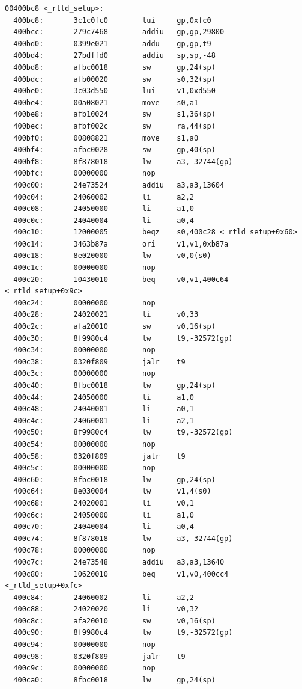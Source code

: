 \documentclass[11pt]{article}
\begin{document}
\begin{verbatim}
00400bc8 <_rtld_setup>:
  400bc8:       3c1c0fc0        lui     gp,0xfc0
  400bcc:       279c7468        addiu   gp,gp,29800
  400bd0:       0399e021        addu    gp,gp,t9
  400bd4:       27bdffd0        addiu   sp,sp,-48
  400bd8:       afbc0018        sw      gp,24(sp)
  400bdc:       afb00020        sw      s0,32(sp)
  400be0:       3c03d550        lui     v1,0xd550
  400be4:       00a08021        move    s0,a1
  400be8:       afb10024        sw      s1,36(sp)
  400bec:       afbf002c        sw      ra,44(sp)
  400bf0:       00808821        move    s1,a0
  400bf4:       afbc0028        sw      gp,40(sp)
  400bf8:       8f878018        lw      a3,-32744(gp)
  400bfc:       00000000        nop
  400c00:       24e73524        addiu   a3,a3,13604
  400c04:       24060002        li      a2,2
  400c08:       24050000        li      a1,0
  400c0c:       24040004        li      a0,4
  400c10:       12000005        beqz    s0,400c28 <_rtld_setup+0x60>
  400c14:       3463b87a        ori     v1,v1,0xb87a
  400c18:       8e020000        lw      v0,0(s0)
  400c1c:       00000000        nop
  400c20:       10430010        beq     v0,v1,400c64 <_rtld_setup+0x9c>
  400c24:       00000000        nop
  400c28:       24020021        li      v0,33
  400c2c:       afa20010        sw      v0,16(sp)
  400c30:       8f9980c4        lw      t9,-32572(gp)
  400c34:       00000000        nop
  400c38:       0320f809        jalr    t9
  400c3c:       00000000        nop
  400c40:       8fbc0018        lw      gp,24(sp)
  400c44:       24050000        li      a1,0
  400c48:       24040001        li      a0,1
  400c4c:       24060001        li      a2,1
  400c50:       8f9980c4        lw      t9,-32572(gp)
  400c54:       00000000        nop
  400c58:       0320f809        jalr    t9
  400c5c:       00000000        nop
  400c60:       8fbc0018        lw      gp,24(sp)
  400c64:       8e030004        lw      v1,4(s0)
  400c68:       24020001        li      v0,1
  400c6c:       24050000        li      a1,0
  400c70:       24040004        li      a0,4
  400c74:       8f878018        lw      a3,-32744(gp)
  400c78:       00000000        nop
  400c7c:       24e73548        addiu   a3,a3,13640
  400c80:       10620010        beq     v1,v0,400cc4 <_rtld_setup+0xfc>
  400c84:       24060002        li      a2,2
  400c88:       24020020        li      v0,32
  400c8c:       afa20010        sw      v0,16(sp)
  400c90:       8f9980c4        lw      t9,-32572(gp)
  400c94:       00000000        nop
  400c98:       0320f809        jalr    t9
  400c9c:       00000000        nop
  400ca0:       8fbc0018        lw      gp,24(sp)

\end{verbatim}
\end{document}
